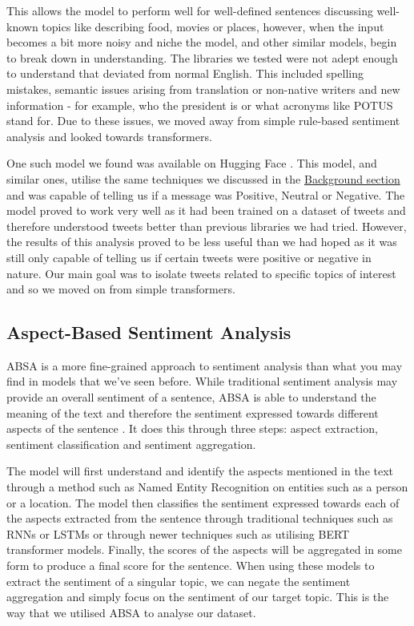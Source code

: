 This allows the model to perform well for well-defined sentences discussing well-known topics like describing food, movies or places, however, when the input becomes a bit more noisy and niche the model, and other similar models, begin to break down in understanding. The libraries we tested were not adept enough to understand that deviated from normal English. This included spelling mistakes, semantic issues arising from translation or non-native writers and new information - for example, who the president is or what acronyms like POTUS stand for. Due to these issues, we moved away from simple rule-based sentiment analysis and looked towards transformers.

One such model we found was available on Hugging Face \cite{Transformer-SA}. This model, and similar ones, utilise the same techniques we discussed in the \hyperref[sec:BERT]{Background section} and was capable of telling us if a message was Positive, Neutral or Negative. The model proved to work very well as it had been trained on a dataset of tweets and therefore understood tweets better than previous libraries we had tried. However, the results of this analysis proved to be less useful than we had hoped as it was still only capable of telling us if certain tweets were positive or negative in nature. Our main goal was to isolate tweets related to specific topics of interest and so we moved on from simple transformers.

\subsection{Aspect-Based Sentiment Analysis}

ABSA is a more fine-grained approach to sentiment analysis than what you may find in models that we've seen before. While traditional sentiment analysis may provide an overall sentiment of a sentence, ABSA is able to understand the meaning of the text and therefore the sentiment expressed towards different aspects of the sentence \cite{ABSA-paper}. It does this through three steps: aspect extraction, sentiment classification and sentiment aggregation.

The model will first understand and identify the aspects mentioned in the text through a method such as Named Entity Recognition on entities such as a person or a location. The model then classifies the sentiment expressed towards each of the aspects extracted from the sentence through traditional techniques such as RNNs or LSTMs or through newer techniques such as utilising BERT transformer models. Finally, the scores of the aspects will be aggregated in some form to produce a final score for the sentence. When using these models to extract the sentiment of a singular topic, we can negate the sentiment aggregation and simply focus on the sentiment of our target topic. This is the way that we utilised ABSA to analyse our dataset.


